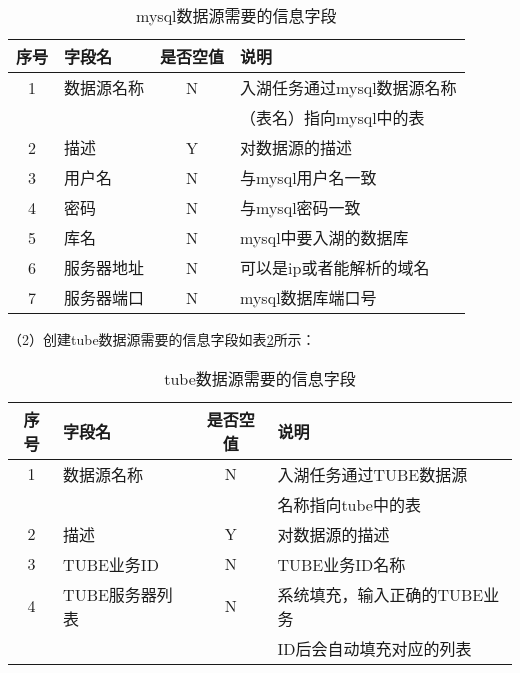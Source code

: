 \begin{table}[H]
  \centering
  \caption{mysql数据源需要的信息字段}
  \label{tab:mysql数据源需要的信息字段}
  \begin{tabular}{clcl}
    \toprule
    序号  & 字段名     & 是否空值   & 说明    \\
    \midrule
    1    & 数据源名称  & N        & 入湖任务通过mysql数据源名称  \\
         &           &          & （表名）指向mysql中的表      \\
    2    & 描述       & Y        & 对数据源的描述                                \\
    3    & 用户名     & N        & 与mysql用户名一致                             \\
    4    & 密码       & N        &  与mysql密码一致                             \\
    5    & 库名       & N        &   mysql中要入湖的数据库                       \\
    6    & 服务器地址  & N        &  可以是ip或者能解析的域名                      \\
    7    & 服务器端口  & N        &   mysql数据库端口号                          \\
    \bottomrule
  \end{tabular}
\end{table}

（2）创建tube数据源需要的信息字段如表\ref{tab:tube数据源需要的信息字段}所示：

\begin{table}[H]
  \centering
  \caption{tube数据源需要的信息字段}
  \label{tab:tube数据源需要的信息字段}
  \begin{tabular}{clcl}
    \toprule
    序号  & 字段名     & 是否空值   & 说明                                      \\
    \midrule
    1    & 数据源名称  & N        & 入湖任务通过TUBE数据源   \\
         &           &          & 名称指向tube中的表       \\
    2    & 描述       & Y        & 对数据源的描述                                \\
    3    & TUBE业务ID     & N        & TUBE业务ID名称                             \\
    4    & TUBE服务器列表       & N        &  系统填充，输入正确的TUBE业务     \\
         &                   &            &  ID后会自动填充对应的列表         \\
    \bottomrule
  \end{tabular}
\end{table}

